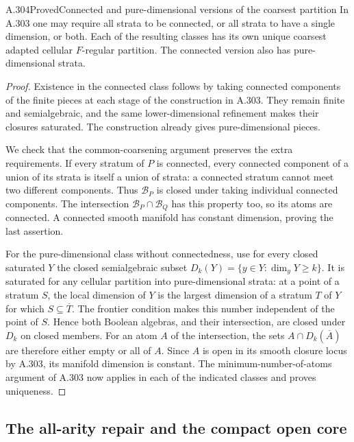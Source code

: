 \begin{saresult}{A.304}{Proved}{Connected and pure-dimensional versions of the coarsest partition}
In A.303 one may require all strata to be connected, or all strata
to have a single dimension, or both. Each of the resulting classes
has its own unique coarsest adapted cellular $F$-regular partition.
The connected version also has pure-dimensional strata.
\end{saresult}
\begin{proof}
Existence in the connected class follows by taking connected components
of the finite pieces at each stage of the construction in A.303.
They remain finite and semialgebraic, and the same lower-dimensional
refinement makes their closures saturated. The construction already
gives pure-dimensional pieces.

We check that the common-coarsening argument preserves the extra
requirements. If every stratum of $P$ is connected, every connected
component of a union of its strata is itself a union of strata:
a connected stratum cannot meet two different components. Thus
$\mathcal B_P$ is closed under taking individual connected components.
The intersection $\mathcal B_P\cap\mathcal B_Q$ has this property too,
so its atoms are connected. A connected smooth manifold has constant
dimension, proving the last assertion.

For the pure-dimensional class without connectedness, use for every
closed saturated $Y$ the closed semialgebraic subset
$D_k(Y)=\{y\in Y:\dim_yY\ge k\}$. It is saturated for any cellular
partition into pure-dimensional strata: at a point of a stratum $S$,
the local dimension of $Y$ is the largest dimension of a stratum $T$
of $Y$ for which $S\subseteq\overline T$. The frontier condition
makes this number independent of the point of $S$. Hence both Boolean
algebras, and their intersection, are closed under $D_k$ on closed
members. For an atom $A$ of the intersection, the sets
$A\cap D_k(\overline A)$ are therefore either empty or all of $A$.
Since $A$ is open in its smooth closure locus by A.303, its manifold
dimension is constant. The minimum-number-of-atoms argument of A.303
now applies in each of the indicated classes and proves uniqueness.
\end{proof}

\subsection{The all-arity repair and the compact open core}

